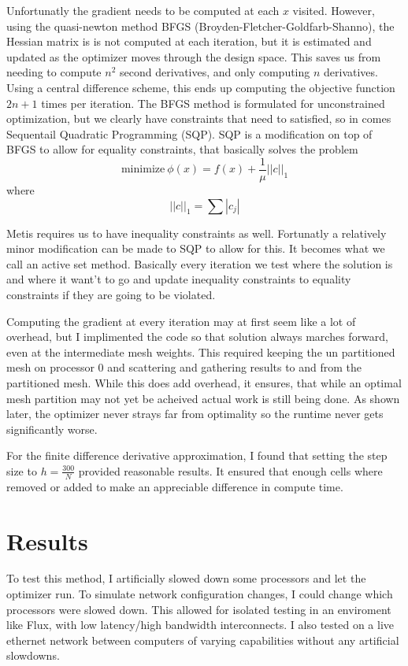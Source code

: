 \documentclass[12pt,parskip=full]{article}
\numberwithin{subsection}{section}
\begin{document}
		Unfortunatly the gradient needs to be computed at each $x$ visited. However, using the quasi-newton method BFGS (Broyden-Fletcher-Goldfarb-Shanno),
		the Hessian matrix is is not computed at each iteration, but it is estimated and updated as the optimizer moves through the design space. This saves
		us from needing to compute $n^2$ second derivatives, and only computing $n$ derivatives. Using a central difference scheme, this ends up 
		computing the objective function $2n + 1$ times per iteration. The BFGS method is formulated for unconstrained optimization, but we clearly
		have constraints that need to satisfied, so in comes Sequentail Quadratic Programming (SQP). SQP is a modification on top of BFGS to
		allow for equality constraints, that basically solves the problem
		\begin{equation}
			\mathrm{minimize \ } \phi(x) = f(x) + \frac{1}{\mu}||c||_1
		\end{equation}
		where
		\begin{equation}
			||c||_1 = \sum{|c_j|}
		\end{equation}

		Metis requires us to have inequality constraints as well. Fortunatly a relatively minor modification can be made to SQP to allow for this.
		It becomes what we call an active set method. Basically every iteration we test where the solution is and where it want't to go and
		update inequality constraints to equality constraints if they are going to be violated.

		Computing the gradient at every iteration may at first seem like a lot of overhead, but I implimented the code so that solution always marches
		forward, even at the intermediate mesh weights. This required keeping the un partitioned mesh on processor 0 and scattering and gathering
		results to and from the partitioned mesh. While this does add overhead, it ensures, that while an optimal mesh partition may not yet be acheived
		actual work is still being done. As shown later, the optimizer never strays far from optimality so the runtime never gets significantly worse.
		
		For the finite difference derivative approximation, I found that setting the step size to $h = \frac{300}{N}$ provided reasonable results.
		It ensured that enough cells where removed or added to make an appreciable difference in compute time.

	\section{Results}
		To test this method, I artificially slowed down some processors and let the optimizer run. To simulate network configuration changes, I could
		change which processors were slowed down. This allowed for isolated testing in an enviroment like Flux, with low latency/high bandwidth interconnects.
		I also tested on a live ethernet network between computers of varying capabilities without any artificial slowdowns.
\end{document}
